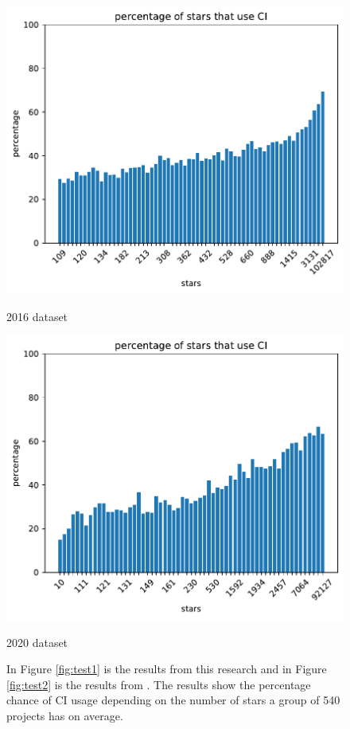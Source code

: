 \documentclass[twoside,12pt,titlepage,a4paper]{article}
\begin{document}
\begin{figure}[!htbp]
  \centering
  \begin{minipage}{.48\textwidth}
    \centering
    \includegraphics[width=.9\textwidth]{../src/results/percentage sub with CI other paper source.pdf}
    \caption[]{2016 dataset}
    \label{fig:test2}
  \end{minipage}
  \begin{minipage}{.48\textwidth}
    \centering
    \includegraphics[width=.9\textwidth]{../src/results/percentage stars with CI.pdf}
    \caption{2020 dataset}
    \label{fig:test1}
  \end{minipage}%
  \hfill
  \caption{In Figure \ref{fig:test1} is the results from this research and in Figure \ref{fig:test2} is the results from \cite{Hilton2016}. The results show the percentage chance of CI usage depending on the number of stars a group of 540 projects has on average.}
  \label{fig:comparison_percentage_star_usage}
\end{figure}
\end{document}
